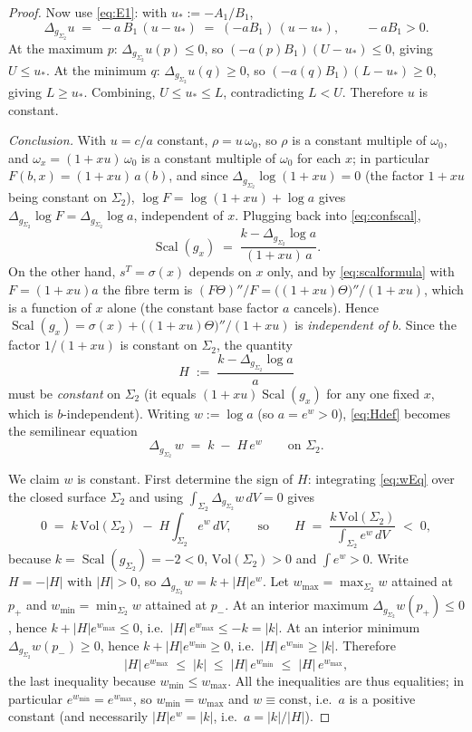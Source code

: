 \documentclass{amsart}
\theoremstyle{definition}
\DeclareMathOperator{\Scal}{Scal}
\begin{document}
\begin{proof}
Now use \eqref{eq:E1}: with $u_\ast:=-A_1/B_1$,
\[
  \Delta_{g_{\Sigma_2}}u \;=\; -a\,B_1\,(u-u_\ast)\;=\;(-aB_1)\,(u-u_\ast),
  \qquad -aB_1>0 .
\]
At the maximum $p$: $\Delta_{g_{\Sigma_2}}u(p)\le0$, so $(-a(p)B_1)(U-u_\ast)\le0$,
giving $U\le u_\ast$. At the minimum $q$: $\Delta_{g_{\Sigma_2}}u(q)\ge0$, so
$(-a(q)B_1)(L-u_\ast)\ge0$, giving $L\ge u_\ast$. Combining, $U\le u_\ast\le L$,
contradicting $L<U$. Therefore $u$ is constant.

\emph{Conclusion.} With $u=c/a$ constant, $\rho=u\,\omega_0$, so $\rho$ is a
constant multiple of $\omega_0$, and $\omega_x=(1+xu)\,\omega_0$ is a constant
multiple of $\omega_0$ for each $x$; in particular $F(b,x)=(1+xu)\,a(b)$, and
since $\Delta_{g_{\Sigma_2}}\log(1+xu)=0$ (the factor $1+xu$ being constant on
$\Sigma_2$), $\log F=\log(1+xu)+\log a$ gives
$\Delta_{g_{\Sigma_2}}\log F=\Delta_{g_{\Sigma_2}}\log a$, independent of $x$.
Plugging back into \eqref{eq:confscal},
\[
  \Scal(g_x)\;=\;\frac{k-\Delta_{g_{\Sigma_2}}\log a}{(1+xu)\,a}.
\]
On the other hand, $s^T=\sigma(x)$ depends on $x$ only, and by
\eqref{eq:scalformula} with $F=(1+xu)a$ the fibre term is
$(F\Theta)''/F=\bigl((1+xu)\Theta\bigr)''/(1+xu)$, which is a function of $x$
alone (the constant base factor $a$ cancels). Hence
$\Scal(g_x)=\sigma(x)+\bigl((1+xu)\Theta\bigr)''/(1+xu)$ is \emph{independent of
$b$}. Since the factor $1/(1+xu)$ is constant on $\Sigma_2$, the quantity
\begin{equation}\label{eq:Hdef}
  H \;:=\; \frac{k-\Delta_{g_{\Sigma_2}}\log a}{a}
\end{equation}
must be \emph{constant} on $\Sigma_2$ (it equals $(1+xu)\Scal(g_x)$ for any one
fixed $x$, which is $b$-independent). Writing $w:=\log a$ (so $a=e^{w}>0$),
\eqref{eq:Hdef} becomes the semilinear equation
\begin{equation}\label{eq:wEq}
  \Delta_{g_{\Sigma_2}}\,w \;=\; k \;-\; H\,e^{w}\qquad\text{on }\Sigma_2 .
\end{equation}

We claim $w$ is constant. First determine the sign of $H$: integrating
\eqref{eq:wEq} over the closed surface $\Sigma_2$ and using
$\int_{\Sigma_2}\Delta_{g_{\Sigma_2}}w\,dV=0$ gives
\[
  0 \;=\; k\,\mathrm{Vol}(\Sigma_2)\;-\;H\int_{\Sigma_2} e^{w}\,dV,
  \qquad\text{so}\qquad
  H \;=\; \frac{k\,\mathrm{Vol}(\Sigma_2)}{\int_{\Sigma_2}e^{w}\,dV}\;<\;0,
\]
because $k=\Scal(g_{\Sigma_2})=-2<0$, $\mathrm{Vol}(\Sigma_2)>0$ and
$\int e^{w}>0$. Write $H=-|H|$ with $|H|>0$, so
$\Delta_{g_{\Sigma_2}}w=k+|H|e^{w}$. Let $w_{\max}=\max_{\Sigma_2}w$ attained at
$p_+$ and $w_{\min}=\min_{\Sigma_2}w$ attained at $p_-$. At an interior maximum
$\Delta_{g_{\Sigma_2}}w(p_+)\le0$, hence $k+|H|e^{w_{\max}}\le0$, i.e.\
$|H|\,e^{w_{\max}}\le -k=|k|$. At an interior minimum
$\Delta_{g_{\Sigma_2}}w(p_-)\ge0$, hence $k+|H|e^{w_{\min}}\ge0$, i.e.\
$|H|\,e^{w_{\min}}\ge|k|$. Therefore
\[
  |H|\,e^{w_{\max}} \;\le\; |k| \;\le\; |H|\,e^{w_{\min}}
  \;\le\; |H|\,e^{w_{\max}},
\]
the last inequality because $w_{\min}\le w_{\max}$. All the inequalities are thus
equalities; in particular $e^{w_{\min}}=e^{w_{\max}}$, so $w_{\min}=w_{\max}$ and
$w\equiv\text{const}$, i.e.\ $a$ is a positive constant (and necessarily
$|H|e^{w}=|k|$, i.e.\ $a=|k|/|H|$).


\end{proof}
\end{document}
